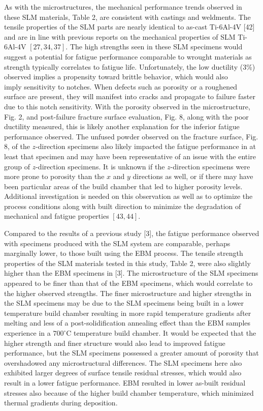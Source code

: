 \documentclass[10pt]{article}
\begin{document}
As with the microstructures, the mechanical performance trends observed in these SLM materials, Table 2, are consistent with castings and weldments. The tensile properties of the SLM parts are nearly identical to as-cast Ti-6Al-4V [42] and are in line with previous reports on the mechanical properties of SLM Ti-6Al-4V $[27,34,37]$. The high strengths seen in these SLM specimens would suggest a potential for fatigue performance comparable to wrought materials as strength typically correlates to fatigue life. Unfortunately, the low ductility (3\%) observed implies a propensity toward brittle behavior, which would also\\
imply sensitivity to notches. When defects such as porosity or a roughened surface are present, they will manifest into cracks and propagate to failure faster due to this notch sensitivity. With the porosity observed in the microstructure, Fig. 2, and post-failure fracture surface evaluation, Fig. 8, along with the poor ductility measured, this is likely another explanation for the inferior fatigue performance observed. The unfused powder observed on the fracture surface, Fig. 8, of the $z$-direction specimens also likely impacted the fatigue performance in at least that specimen and may have been representative of an issue with the entire group of $z$-direction specimens. It is unknown if the $z$-direction specimens were more prone to porosity than the $x$ and $y$ directions as well, or if there may have been particular areas of the build chamber that led to higher porosity levels. Additional investigation is needed on this observation as well as to optimize the process conditions along with built direction to minimize the degradation of mechanical and fatigue properties $[43,44]$.

Compared to the results of a previous study [3], the fatigue performance observed with specimens produced with the SLM system are comparable, perhaps marginally lower, to those built using the EBM process. The tensile strength properties of the SLM materials tested in this study, Table 2, were also slightly higher than the EBM specimens in [3]. The microstructure of the SLM specimens appeared to be finer than that of the EBM specimens, which would correlate to the higher observed strengths. The finer microstructure and higher strengths in the SLM specimens may be due to the SLM specimens being built in a lower temperature build chamber resulting in more rapid temperature gradients after melting and less of a post-solidification annealing effect than the EBM samples experience in a $700^{\circ} \mathrm{C}$ temperature build chamber. It would be expected that the higher strength and finer structure would also lead to improved fatigue performance, but the SLM specimens possessed a greater amount of porosity that overshadowed any microstructural differences. The SLM specimens here also exhibited larger degrees of surface tensile residual stresses, which would also result in a lower fatigue performance. EBM resulted in lower as-built residual stresses also because of the higher build chamber temperature, which minimized thermal gradients during deposition.
\end{document}
